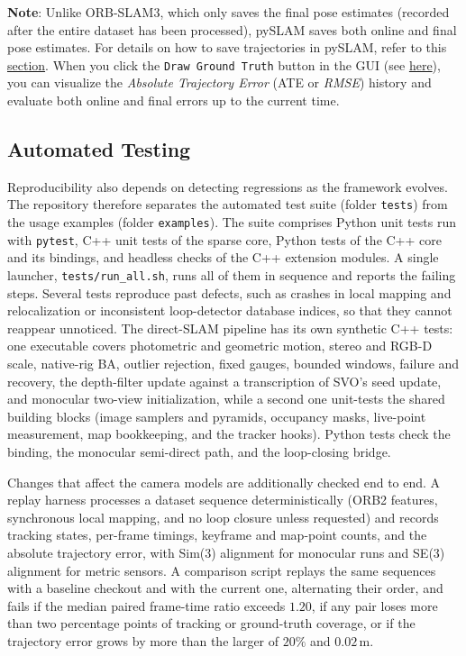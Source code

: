 \documentclass{article}
\begin{document}
\textbf{Note}: Unlike ORB-SLAM3, which only saves the final pose
estimates (recorded after the entire dataset has been processed), pySLAM
saves both online and final pose estimates. For details on how to save
trajectories in pySLAM, refer to this
\protect\hyperlink{trajectory-saving}{section}. When you click the
\texttt{Draw\ Ground\ Truth} button in the GUI (see
\protect\hyperlink{slam-gui}{here}), you can visualize the
\emph{Absolute Trajectory Error} (ATE or \emph{RMSE}) history and
evaluate both online and final errors up to the current time.

\hypertarget{testing}{%
\subsection{Automated Testing}\label{testing}}

Reproducibility also depends on detecting regressions as the framework evolves. The repository therefore separates the automated test suite (folder \texttt{tests}) from the usage examples (folder \texttt{examples}). The suite comprises Python unit tests run with \texttt{pytest}, C++ unit tests of the sparse core, Python tests of the C++ core and its bindings, and headless checks of the C++ extension modules. A single launcher, \texttt{tests/run\_all.sh}, runs all of them in sequence and reports the failing steps. Several tests reproduce past defects, such as crashes in local mapping and relocalization or inconsistent loop-detector database indices, so that they cannot reappear unnoticed. The direct-SLAM pipeline has its own synthetic C++ tests: one executable covers photometric and geometric motion, stereo and RGB-D scale, native-rig BA, outlier rejection, fixed gauges, bounded windows, failure and recovery, the depth-filter update against a transcription of SVO's seed update, and monocular two-view initialization, while a second one unit-tests the shared building blocks (image samplers and pyramids, occupancy masks, live-point measurement, map bookkeeping, and the tracker hooks). Python tests check the binding, the monocular semi-direct path, and the loop-closing bridge.

Changes that affect the camera models are additionally checked end to end. A replay harness processes a dataset sequence deterministically (ORB2 features, synchronous local mapping, and no loop closure unless requested) and records tracking states, per-frame timings, keyframe and map-point counts, and the absolute trajectory error, with Sim(3) alignment for monocular runs and SE(3) alignment for metric sensors. A comparison script replays the same sequences with a baseline checkout and with the current one, alternating their order, and fails if the median paired frame-time ratio exceeds $1.20$, if any pair loses more than two percentage points of tracking or ground-truth coverage, or if the trajectory error grows by more than the larger of $20\%$ and $0.02$\,m.
\end{document}
